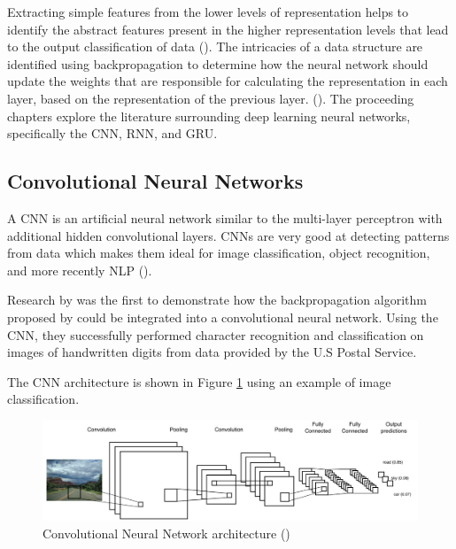 Extracting simple features from the lower levels of representation helps to identify the abstract features present in the higher representation levels that lead to the output classification of data (\cite{bengio_deep_2011}).
%
The intricacies of a data structure are identified using backpropagation to determine how the neural network should update the weights that are responsible for calculating the representation in each layer, based on the representation of the previous layer. (\cite{lecun_deep_2015}). The proceeding chapters explore the literature surrounding deep learning neural networks, specifically the \acrfull{CNN}, \acrfull{RNN}, and \acrfull{GRU}.

\subsection{Convolutional Neural Networks}

A \acrfull{CNN} is an artificial neural network similar to the multi-layer perceptron with additional hidden convolutional layers. \acrshort{CNN}s are very good at detecting patterns from data which makes them ideal for image classification, object recognition, and more recently \acrfull{NLP} (\cite{young_cnns_recent_2018}).

Research by \cite{lecun_backprop_cnn_1989} was the first to demonstrate how the backpropagation algorithm proposed by \cite{rumelhart_learning_1986} could be integrated into a convolutional neural network.
Using the \acrshort{CNN}, they successfully performed character recognition and classification on images of handwritten digits from data provided by the U.S Postal Service.

The \acrshort{CNN} architecture is shown in Figure \ref{fig:cnn_1} using an example of image classification.

\begin{figure}[ht!]
\centering
\includegraphics[width=1\textwidth]{media/literature/machine_learning/ml_cnn_1.png}
\caption[Convolutional neural network architecture]{Convolutional Neural Network architecture (\cite{lopez_deep_2017})}
\label{fig:cnn_1}
\end{figure}

